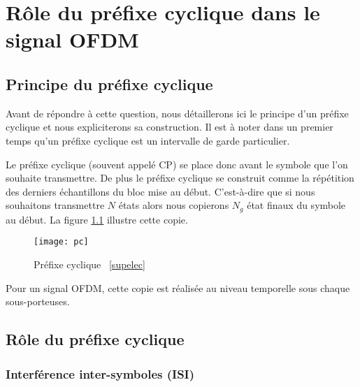 \chapter{Rôle du préfixe cyclique dans le signal OFDM}

\section{Principe du préfixe cyclique}

Avant de répondre à cette question, nous détaillerons ici le principe d'un
préfixe cyclique et nous expliciterons sa construction. Il est à noter dans un
premier temps qu'un préfixe cyclique est un intervalle de garde
particulier. ~\\


Le préfixe cyclique (souvent appelé CP) se place donc avant le symbole que l'on
souhaite transmettre. De plus le préfixe cyclique se construit comme la
répétition des derniers échantillons du bloc mise au début. C'est-à-dire que si
nous souhaitons transmettre $N$ états alors nous copierons $N_g$ état finaux du
symbole au début. La figure \ref{fig:PC} illustre cette copie.

\begin{figure}[!h]
  \centering
  \texttt{[image: pc]}
  \caption{Préfixe cyclique ~\ref{supelec}} %
  \label{fig:PC}
\end{figure}

Pour un signal OFDM, cette copie est réalisée au niveau temporelle sous chaque
sous-porteuses.

\section{Rôle du préfixe cyclique}

\subsection{Interférence inter-symboles (ISI)}
\label{sec:ISI}





